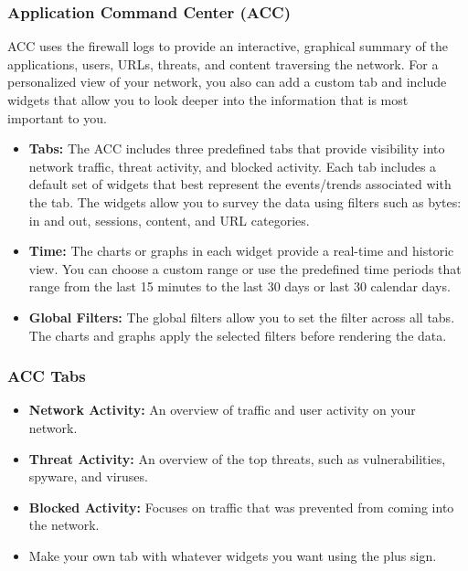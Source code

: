 \subsubsection{Application Command Center (ACC)}
ACC uses the firewall logs to provide an interactive, graphical summary of the applications, users, URLs, threats, and content traversing the network.
For a personalized view of your network, you also can add a custom tab and include widgets that allow you to look deeper into the information that is most important to you.
\begin{itemize}
    \item \textbf{Tabs:} The ACC includes three predefined tabs that provide visibility into network traffic, threat activity, and blocked activity. 
    Each tab includes a default set of widgets that best represent the events/trends associated with the tab.
    The widgets allow you to survey the data using filters such as bytes: in and out, sessions, content, and URL categories.
    \item \textbf{Time:} The charts or graphs in each widget provide a real-time and historic view.
    You can choose a custom range or use the predefined time periods that range from the last 15 minutes to the last 30 days or last 30 calendar days.
    \item \textbf{Global Filters:} The global filters allow you to set the filter across all tabs.
    The charts and graphs apply the selected filters before rendering the data.
\end{itemize}

\subsubsection{ACC Tabs}
\begin{itemize}
    \item \textbf{Network Activity:} An overview of traffic and user activity on your network.
    \item \textbf{Threat Activity:} An overview of the top threats, such as vulnerabilities, spyware, and viruses.
    \item \textbf{Blocked Activity:} Focuses on traffic that was prevented from coming into the network.
    \item Make your own tab with whatever widgets you want using the plus sign.
\end{itemize}

